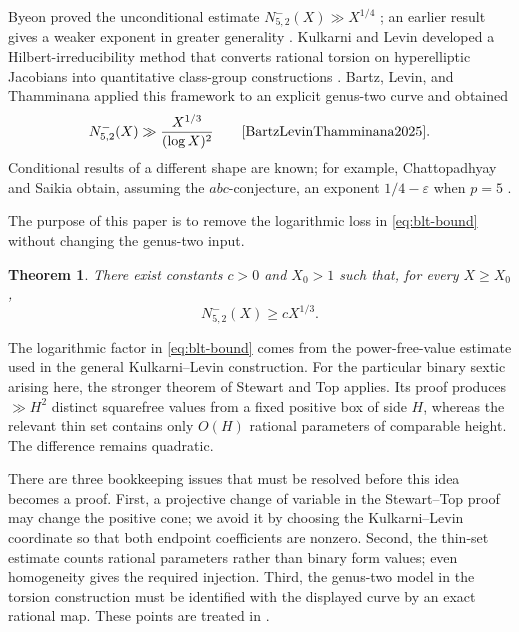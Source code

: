 \documentclass[11pt,reqno]{amsart}
\newtheorem{theorem}{Theorem}[section]
\theoremstyle{definition}
\theoremstyle{remark}
\newcommand{\NoLogCount}{N^{-}_{5,2}}
\begin{document}
Byeon proved the unconditional estimate
\(\NoLogCount(X)\gg X^{1/4}\) \cite{Byeon2009}; an earlier result gives a
weaker exponent in greater generality \cite{Byeon2006}.  Kulkarni and Levin
developed a Hilbert-irreducibility method that converts rational torsion on
hyperelliptic Jacobians into quantitative class-group constructions
\cite{KulkarniLevin2022}.  Bartz, Levin, and Thamminana applied this framework
to an explicit genus-two curve and obtained
\begin{equation}\label{eq:blt-bound}
  \NoLogCount(X)\gg \frac{X^{1/3}}{(\log X)^2}
  \qquad\text{\cite[Theorem~1.3]{BartzLevinThamminana2025}}.
\end{equation}
Conditional results of a different shape are known; for example,
Chattopadhyay and Saikia obtain, assuming the \(abc\)-conjecture, an exponent
\(1/4-\varepsilon\) when \(p=5\) \cite{ChattopadhyaySaikia2023}.

The purpose of this paper is to remove the logarithmic loss in
\eqref{eq:blt-bound} without changing the genus-two input.

\begin{theorem}\label{thm:main}
There exist constants \(c>0\) and \(X_0>1\) such that, for every
\(X\geq X_0\),
\[
  \NoLogCount(X)\geq cX^{1/3}.
\]
\end{theorem}

The logarithmic factor in \eqref{eq:blt-bound} comes from the power-free-value
estimate used in the general Kulkarni--Levin construction.  For the particular
binary sextic arising here, the stronger theorem of Stewart and Top
\cite[Theorem~1]{StewartTop1995} applies.  Its proof produces
\(\gg H^2\) distinct squarefree values from a fixed positive box of side
\(H\), whereas the relevant thin set contains only \(O(H)\) rational
parameters of comparable height.  The difference remains quadratic.

There are three bookkeeping issues that must be resolved before this idea
becomes a proof.  First, a projective change of variable in the
Stewart--Top proof may change the positive cone; we avoid it by choosing the
Kulkarni--Levin coordinate so that both endpoint coefficients are nonzero.
Second, the thin-set estimate counts rational parameters rather than binary
form values; even homogeneity gives the required injection.  Third, the
genus-two model in the torsion construction must be identified with the
displayed curve by an exact rational map.  These points are treated in
.
\end{document}
